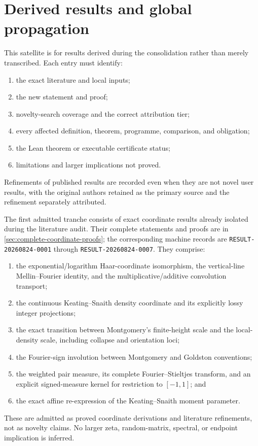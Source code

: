 \section{Derived results and global propagation}

This satellite is for results derived during the consolidation rather than merely transcribed.
Each entry must identify:
\begin{enumerate}[label=\alph*)]
  \item the exact literature and local inputs;
  \item the new statement and proof;
  \item novelty-search coverage and the correct attribution tier;
  \item every affected definition, theorem, programme, comparison, and obligation;
  \item the Lean theorem or executable certificate status;
  \item limitations and larger implications not proved.
\end{enumerate}

Refinements of published results are recorded even when they are not novel user results, with
the original authors retained as the primary source and the refinement separately attributed.

The first admitted tranche consists of exact coordinate results already isolated during the
literature audit.  Their complete statements and proofs are in
\cref{sec:complete-coordinate-proofs}; the corresponding machine records are
\texttt{RESULT-20260824-0001} through \texttt{RESULT-20260824-0007}.  They comprise:
\begin{enumerate}
  \item the exponential/logarithm Haar-coordinate isomorphism, the vertical-line
  Mellin--Fourier identity, and the multiplicative/additive convolution transport;
  \item the continuous Keating--Snaith density coordinate and its explicitly lossy integer
  projections;
  \item the exact transition between Montgomery's finite-height scale and the local-density
  scale, including collapse and orientation loci;
  \item the Fourier-sign involution between Montgomery and Goldston conventions;
  \item the weighted pair measure, its complete Fourier--Stieltjes transform, and an explicit
  signed-measure kernel for restriction to $[-1,1]$; and
  \item the exact affine re-expression of the Keating--Snaith moment parameter.
\end{enumerate}
These are admitted as proved coordinate derivations and literature refinements, not as
novelty claims.  No larger zeta, random-matrix, spectral, or endpoint implication is inferred.

